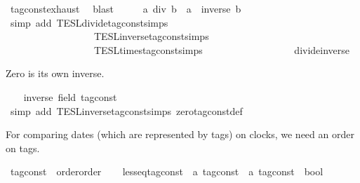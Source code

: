 \begin{isabellebody}
\ tag{\isacharunderscore}const{\isachardot}exhaust\ \isamarkupfalse%
\ blast\isanewline
\ \ \isamarkupfalse%
\ \isamarkupfalse%
\ {\isacartoucheopen}a\ div\ b\ {\isacharequal}\ a\ {\isacharasterisk}\ inverse\ b{\isacartoucheclose}\isanewline
\ \ \ \ \isamarkupfalse%
\ {\isacharparenleft}simp\ add{\isacharcolon}\ TESL{\isachardot}divide{\isacharunderscore}tag{\isacharunderscore}const{\isachardot}simps\isanewline
\ \ \ \ \ \ \ \ \ \ \ \ \ \ \ \ \ \ TESL{\isachardot}inverse{\isacharunderscore}tag{\isacharunderscore}const{\isachardot}simps\isanewline
\ \ \ \ \ \ \ \ \ \ \ \ \ \ \ \ \ \ TESL{\isachardot}times{\isacharunderscore}tag{\isacharunderscore}const{\isachardot}simps\isanewline
\ \ \ \ \ \ \ \ \ \ \ \ \ \ \ \ \ \ divide{\isacharunderscore}inverse{\isacharparenright}\isanewline
{}\isamarkupfalse%
%
\begin{isamarkuptext}%
Zero is its own inverse.%
\end{isamarkuptext}\isamarkuptrue%
\ \ \isamarkupfalse%
\ {\isacartoucheopen}inverse\ {\isacharparenleft}{}{\isacharcolon}{\isacharcolon}{\isacharparenleft}{\isacharprime}{\isasymtau}{\isacharcolon}{\isacharcolon}field\ tag{\isacharunderscore}const{\isacharparenright}{\isacharparenright}\ {\isacharequal}\ {}{\isacartoucheclose}\isanewline
\ \ \ \ \isamarkupfalse%
\ {\isacharparenleft}simp\ add{\isacharcolon}\ TESL{\isachardot}inverse{\isacharunderscore}tag{\isacharunderscore}const{\isachardot}simps\ zero{\isacharunderscore}tag{\isacharunderscore}const{\isacharunderscore}def{\isacharparenright}\isanewline
{}\isamarkupfalse%
%
\endisatagproof
{\isafoldproof}%
%
\isadelimproof
%
\endisadelimproof
\isanewline
\isanewline
{}\isamarkupfalse%
%
\begin{isamarkuptext}%
For comparing dates (which are represented by tags) on clocks, we need an order on tags.%
\end{isamarkuptext}\isamarkuptrue%
\isamarkupfalse%
\ tag{\isacharunderscore}const\ {\isacharcolon}{\isacharcolon}\ {\isacharparenleft}order{\isacharparenright}order\isanewline
{}\isanewline
\ \ \isamarkupfalse%
\ less{\isacharunderscore}eq{\isacharunderscore}tag{\isacharunderscore}const\ {\isacharcolon}{\isacharcolon}\ {\isacartoucheopen}{\isacharprime}a\ tag{\isacharunderscore}const\ {\isasymRightarrow}\ {\isacharprime}a\ tag{\isacharunderscore}const\ {\isasymRightarrow}\ bool{\isacartoucheclose}\isanewline

\end{isabellebody}
